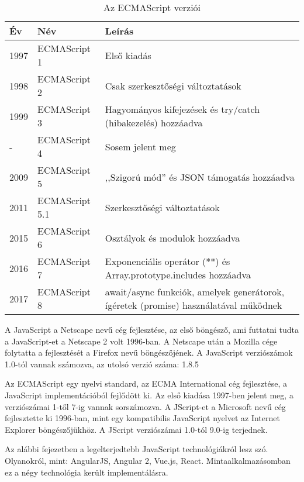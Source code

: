 \begin{table}
\centering
\begin{tabular}{|l|l|p{8cm}|}
\hline
\textbf{Év} & \textbf{Név} & \textbf{Leírás} \\
\hline
1997 & ECMAScript 1 & Első kiadás \\
\hline
1998 & ECMAScript 2 & Csak szerkesztőségi változtatások \\
\hline
1999 & ECMAScript 3 & Hagyományos kifejezések és try/catch (hibakezelés) hozzáadva \\
\hline
- & ECMAScript 4 & Sosem jelent meg \\
\hline
2009 & ECMAScript 5 & ,,Szigorú mód'' és JSON támogatás hozzáadva \\
\hline
2011 & ECMAScript 5.1 & Szerkesztőségi változtatások \\
\hline
2015 & ECMAScript 6 & Osztályok és modulok hozzáadva \\
\hline
2016 & ECMAScript 7 & Exponenciális operátor (**) és Array.prototype.includes hozzáadva \\
\hline
2017 & ECMAScript 8 & await/async funkciók, amelyek generátorok, ígéretek (promise) használatával működnek \\
\hline
\end{tabular}
\caption{Az ECMAScript verziói \cite{ECMAScript}}
\label{tab:ecmascript}
\end{table}

A JavaScript a Netscape nevű cég fejlesztése, az első böngésző, ami futtatni tudta a JavaScript-et a Netscape 2 volt 1996-ban. A Netscape után a Mozilla cége folytatta a fejlesztését a Firefox nevű böngészőjének. A JavaScript verziószámok 1.0-tól vannak számozva, az utolsó verzió száma: 1.8.5

Az ECMAScript egy nyelvi standard, az ECMA International cég fejlesztése, a JavaScript implementációból fejlődött ki. Az első kiadása 1997-ben jelent meg, a verziószámai 1-től 7-ig vannak sorszámozva.
A JScript-et a Microsoft nevű cég fejlesztette ki 1996-ban, mint egy kompatibilis JavaScript nyelvet az Internet Explorer böngészőjükhöz. A JScript verziószámai 1.0-tól 9.0-ig terjednek.



Az alábbi fejezetben a legelterjedtebb JavaScript technológiákról lesz szó. Olyanokról, mint: AngularJS, Angular 2, Vue.js, React. Mintaalkalmazásomban ez a négy technológia került implementálásra.

